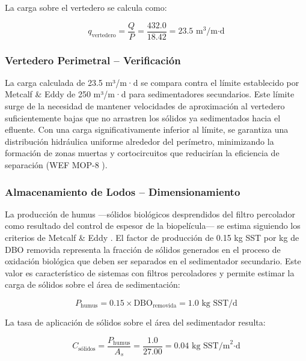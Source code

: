 \documentclass[12pt,a4paper]{article}
\begin{document}
La carga sobre el vertedero se calcula como:

\begin{equation}
q_{\text{vertedero}} = \frac{Q}{P} = \frac{432.0}{18.42} = 23.5 \text{ m}^3\text{/m·d}
\end{equation}

\subsubsection{Vertedero Perimetral -- Verificación}

La carga calculada de 23.5 m³/m·d se compara contra el límite establecido por Metcalf \& Eddy \cite{metcalf2014} de 250 m³/m·d para sedimentadores secundarios. Este límite surge de la necesidad de mantener velocidades de aproximación al vertedero suficientemente bajas que no arrastren los sólidos ya sedimentados hacia el efluente. Con una carga significativamente inferior al límite, se garantiza una distribución hidráulica uniforme alrededor del perímetro, minimizando la formación de zonas muertas y cortocircuitos que reducirían la eficiencia de separación (WEF MOP-8 \cite{wef_mop8_2010}).

\subsubsection{Almacenamiento de Lodos -- Dimensionamiento}

La producción de humus —sólidos biológicos desprendidos del filtro percolador como resultado del control de espesor de la biopelícula— se estima siguiendo los criterios de Metcalf \& Eddy \cite{metcalf2014}. El factor de producción de 0.15 kg SST por kg de DBO removida representa la fracción de sólidos generados en el proceso de oxidación biológica que deben ser separados en el sedimentador secundario. Este valor es característico de sistemas con filtros percoladores y permite estimar la carga de sólidos sobre el área de sedimentación:

\begin{equation}
P_{\text{humus}} = 0.15 \times \text{DBO}_{\text{removida}} = 1.0 \text{ kg SST/d}
\end{equation}

La tasa de aplicación de sólidos sobre el área del sedimentador resulta:

\begin{equation}
C_{\text{sólidos}} = \frac{P_{\text{humus}}}{A_s} = \frac{1.0}{27.00} = 0.04 \text{ kg SST/m}^2\text{·d}
\end{equation}
\end{document}
